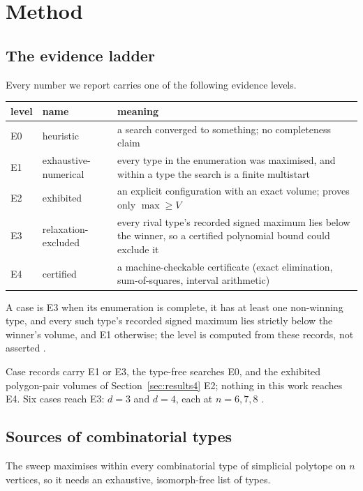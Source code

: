 \section{Method}
\label{sec:method}

\subsection{The evidence ladder}

Every number we report carries one of the following evidence levels.

\begin{center}
\begin{tabular}{llp{}}
  \toprule
  level & name & meaning \\
  \midrule
  E0 & heuristic & a search converged to something; no completeness claim \\
  E1 & exhaustive-numerical & every type in the enumeration was maximised, and
       within a type the search is a finite multistart \\
  E2 & exhibited & an explicit configuration with an exact volume; proves only
       $\max \geq V$ \\
  E3 & relaxation-excluded & every rival type's recorded signed maximum lies
       below the winner, so a certified polynomial bound could exclude it \\
  E4 & certified & a machine-checkable certificate (exact elimination,
       sum-of-squares, interval arithmetic) \\
  \bottomrule
\end{tabular}
\end{center}

A case is E3 when its enumeration is complete, it has at least one non-winning
type, and every such type's recorded signed maximum lies strictly below the
winner's volume, and E1 otherwise; the level is computed from these records,
not asserted .

Case records carry E1 or E3, the type-free searches E0, and the exhibited
polygon-pair volumes of Section~\ref{sec:results4} E2; nothing in this work
reaches E4. Six cases reach E3: $d = 3$ and $d = 4$, each at $n = 6, 7, 8$
.

\subsection{Sources of combinatorial types}

The sweep maximises within every combinatorial type of simplicial polytope on
$n$ vertices, so it needs an exhaustive, isomorph-free list of types.

